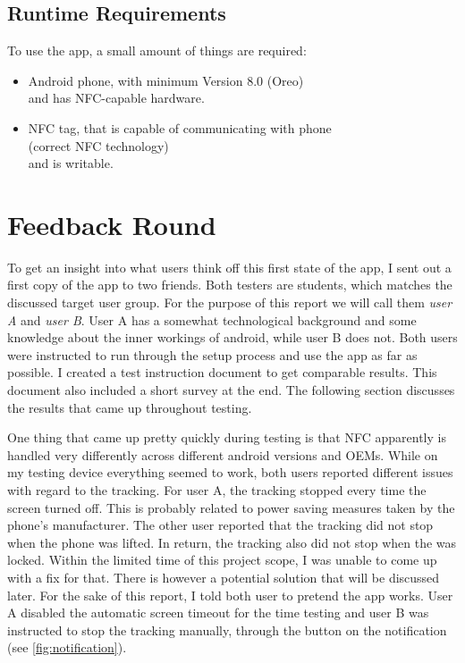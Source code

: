 \documentclass[conference]{IEEEtran}
\begin{document}
\subsection{Runtime Requirements}
To use the app, a small amount of things are required:

\begin{itemize}
	\item Android phone, with minimum Version 8.0 (Oreo)\\
	and has NFC-capable hardware.
	\item NFC tag, that is capable of communicating with phone\\
	(correct NFC technology)\\
	and is writable.
\end{itemize}

\section{Feedback Round}
To get an insight into what users think off this first state of the app, I sent out a first copy of the app to two friends. Both testers are students, which matches the discussed target user group. For the purpose of this report we will call them \textit{user A} and \textit{user B}. User A has a somewhat technological background and some knowledge about the inner workings of android, while user B does not.
Both users were instructed to run through the setup process and use the app as far as possible. I created a test instruction document to get comparable results. This document also included a short survey at the end. The following section discusses the results that came up throughout testing.

One thing that came up pretty quickly during testing is that NFC apparently is handled very differently across different android versions and OEMs. While on my testing device everything seemed to work, both users reported different issues with regard to the tracking. For user A, the tracking stopped every time the screen turned off. This is probably related to power saving measures taken by the phone's manufacturer. The other user reported that the tracking did not stop when the phone was lifted. In return, the tracking also did not stop when the was locked. Within the limited time of this project scope, I was unable to come up with a fix for that. There is however a potential solution that will be discussed later. For the sake of this report, I told both user to pretend the app works. User A disabled the automatic screen timeout for the time testing and user B was instructed to stop the tracking manually, through the button on the notification (see \cref{fig:notification}).
\end{document}
